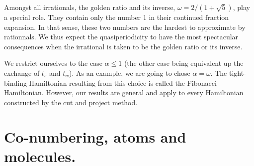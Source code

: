 \documentclass[aps,prl,preprint]{revtex4-1}
\begin{document}
Amongst all irrationals, the golden ratio and its inverse, $\omega = 2/(1+\sqrt{5})$, play a special role. They contain only the number 1 in their continued fraction expansion. In that sense, these two numbers are the hardest to approximate by rationnals. 
We thus expect the quasiperiodicity to have the most spectacular consequences when the irrational is taken to be the golden ratio or its inverse.

We restrict ourselves to the case $\alpha \leq 1$ (the other case being equivalent up the exchange of $t_s$ and $t_w$). As an example, we are going to chose $\alpha = \omega$. The tight-binding Hamiltonian resulting from this choice is called the Fibonacci Hamiltonian.
However, our results are general and apply to every Hamiltonian constructed by the cut and project method.

\section{Co-numbering, atoms and molecules.}
\end{document}
